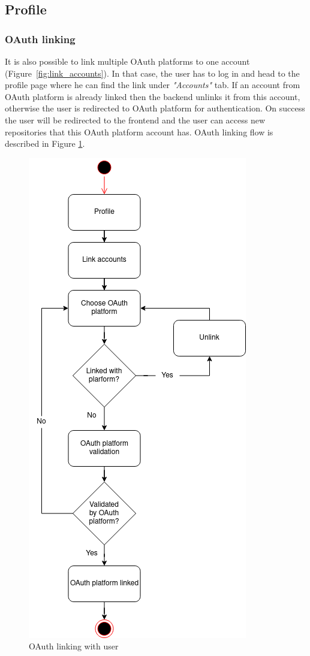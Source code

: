 \subsection{Profile}\label{subsec:profile}
\subsubsection{OAuth linking}\label{subsubsec:oauth-linking}
It is also possible to link multiple OAuth platforms to one account (Figure~\ref{fig:link_accounts}).
In that case, the user has to log in and head to the profile page where he can find the link  under \textit{"Accounts"} tab.
If an account from OAuth platform is already linked then the backend unlinks it from this account, otherwise the user is redirected to OAuth platform for authentication.
On success the user will be redirected to the frontend and the user can access new repositories that this OAuth platform account has.
OAuth linking flow is described in Figure
\ref{fig:account-linking}.

\begin{figure}[H]
    \centering
    \includegraphics[width=0.5\linewidth]{figures/oauth_linking_user_flow}
    \caption{OAuth linking with user}
    \label{fig:account-linking}
\end{figure}

